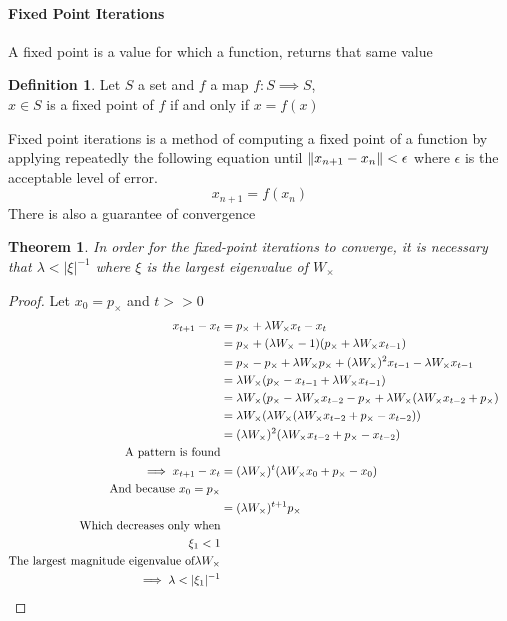 \documentclass{article}
\DeclarePairedDelimiter{\norm}{\lVert}{\rVert}
\newtheorem{theorem}{Theorem}
\theoremstyle{definition}
\newtheorem{definition}{Definition}
\begin{document}
\paragraph{Fixed Point Iterations}
A fixed point is a value for which a function, returns that same value 
\begin{definition}
	Let $S$ a set and $f$ a map $f : S \implies S$,\\
	$x \in S$ is a fixed point of $f$ if and only if $x=f(x)$ 
\end{definition}
Fixed point iterations is a method of computing a fixed point of a function by applying repeatedly the following equation until $\norm{x_{n+1}-x_{n}}<\epsilon$ where $\epsilon$ is the acceptable level of error.
\begin{equation}
	x_{n+1} = f(x_n)
\end{equation}
There is also a guarantee of convergence 
\begin{theorem}
	In order for the fixed-point iterations to converge, it is necessary that $\lambda<|\xi|^{-1}$ where $\xi$ is the largest eigenvalue of $W_\times$
\end{theorem}
\begin{proof}
  Let $x_0=p_\times$ and $t>>0$
  \begin{align*}
      x_{t+1}-x_t &= p_\times+\lambda W_{\times} x_t - x_t &\\
      &= p_{\times}+(\lambda W_{\times} - 1)(p_{\times}+\lambda W_{\times} x_{t-1})\\
      &= p_{\times} - p_{\times} + \lambda W_{\times}p_{\times} + (\lambda W_{\times})^2 x_{t-1} - \lambda W_{\times} x_{t-1}\\
      &= \lambda W_{\times}(p_{\times}-x_{t-1}+\lambda W_{\times} x_{t-1}) \\
      &= \lambda W_{\times}(p_{\times}-\lambda W_{\times} x_{t-2} - p_{\times} + \lambda W_{\times}(\lambda W_{\times} x_{t-2} +p_{\times}) \\
      &= \lambda W_{\times} ( \lambda W_{\times} (\lambda W_{\times} x_{t-2}+p_{\times}-x_{t-2})) \\
      &= (\lambda W_{\times})^2(\lambda W_{\times} x_{t-2}+p_{\times} - x_{t-2}) & \\
      \text{A pattern is found}\\
      \implies x_{t+1}-x_t &= (\lambda W_{\times})^t (\lambda W_{\times} x_0 + p_{\times} - x_0) & \\
      \text{And because } x_0 = p_{\times}\\
      &= (\lambda W_{\times})^{t+1} p_{\times}\\
      \text{Which decreases only when}\\
      \xi_1 < 1\\
      \text{The largest magnitude eigenvalue of} \lambda W_{\times}\\
      \implies \lambda < |\xi_1|^{-1}
      && \qedhere
  \end{align*}
\end{proof}
\end{document}
